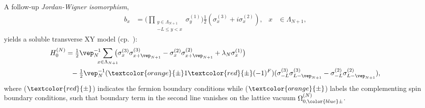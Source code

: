 \documentclass[a4paper, 11pt]{article}
\newcommand{\textr}{\textcolor{red}}
\newcommand{\texto}{\textcolor{orange}}
\DeclareMathOperator{\1}{\mathds{1}}
\begin{document}
A follow-up \textit{Jordan-Wigner isomorphism},
\begin{align}
\label{eq:JWtrafo}
b_{x} & = \Big(\prod_{\substack{y\in\Lambda_{N+1} \\ -L\leq y<x}}\sigma^{(1)}_{y}\Big)\tfrac{1}{2}(\sigma^{(3)}_{x}+i\sigma^{(2)}_{x}), & x & \in\Lambda_{N+1},
\end{align}
yields a soluble transverse XY model (cp.~\cite{LiebTwoSolubleModels}):
\begin{align}
\label{eq:XYmodel}
H^{(N)}_{0} & = \tfrac{1}{2}\vep_{N}^{-1} \hspace{-0.25cm}\sum_{x\in\Lambda_{N+1}} \hspace{-0.25cm}\big(\sigma^{(3)}_{x}\sigma^{(3)}_{x+\vep_{N+1}}-\sigma^{(2)}_{x}\sigma^{(2)}_{x+\vep_{N+1}}+\lambda_{N}\sigma^{(1)}_{x}\big) \\ \nonumber
& \hspace{0.25cm} -\tfrac{1}{2}\vep_{N}^{-1}(\texto{\pm}1\textr{\pm}(-1)^{F})(\sigma^{(3)}_{-L}\sigma^{(3)}_{L-\vep_{N+1}}-\sigma^{(2)}_{-L}\sigma^{(2)}_{L-\vep_{N+1}}),
\end{align}
where ($\textr{\pm}$) indicates the fermion boundary conditions while ($\texto{\pm}$) labels the complementing spin boundary conditions, such that boundary term in the second line vanishes on the lattice vacuum $\Omega^{(N)}_{0,{\color{blue}\pm}}$.
\end{document}
